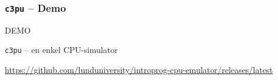 \begin{frame}[fragile]
    \frametitle{\texttt{c3pu} -- Demo}

    \begin{center}
        \Huge DEMO

        {\Large \texttt{c3pu} -- en enkel CPU-simulator}

        \bigskip
        \normalsize\url{https://github.com/lunduniversity/introprog-cpu-emulator/releases/latest}
    \end{center}
\end{frame}